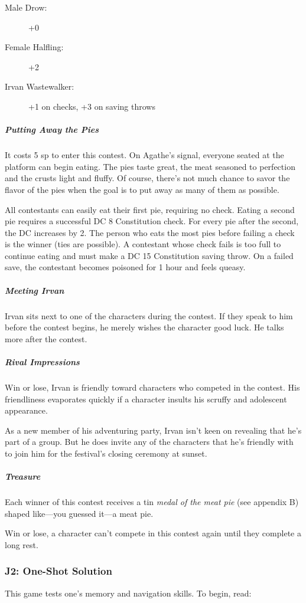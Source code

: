 \documentclass[10pt,a4paper,twoside,bg=print,twocolumn,openany,nodeprecatedcode]{dndbook}
\begin{document}
\begin{description}
\item[Male Drow:]
+0
\item[Female Halfling:]
+2
\item[Irvan Wastewalker:]
+1 on checks, +3 on saving throws
\end{description}

\subparagraph{Putting Away the Pies}
It costs 5 sp to enter this contest. On Agathe's signal, everyone seated at the platform can begin eating. The pies taste great, the meat seasoned to perfection and the crusts light and fluffy. Of course, there's not much chance to savor the flavor of the pies when the goal is to put away as many of them as possible.

All contestants can easily eat their first pie, requiring no check. Eating a second pie requires a successful DC 8 Constitution check. For every pie after the second, the DC increases by 2. The person who eats the most pies before failing a check is the winner (ties are possible). A contestant whose check fails is too full to continue eating and must make a DC 15 Constitution saving throw. On a failed save, the contestant becomes poisoned for 1 hour and feels queasy.

\subparagraph{Meeting Irvan}
Irvan sits next to one of the characters during the contest. If they speak to him before the contest begins, he merely wishes the character good luck. He talks more after the contest.

\subparagraph{Rival Impressions}
Win or lose, Irvan is friendly toward characters who competed in the contest. His friendliness evaporates quickly if a character insults his scruffy and adolescent appearance.

As a new member of his adventuring party, Irvan isn't keen on revealing that he's part of a group. But he does invite any of the characters that he's friendly with to join him for the festival's closing ceremony at sunset.

\subparagraph{Treasure}
Each winner of this contest receives a tin \textit{medal of the meat pie} (see appendix B) shaped like—you guessed it—a meat pie.

Win or lose, a character can't compete in this contest again until they complete a long rest.

\subsubsection{J2: One-Shot Solution}
This game tests one's memory and navigation skills. To begin, read:
\end{document}
